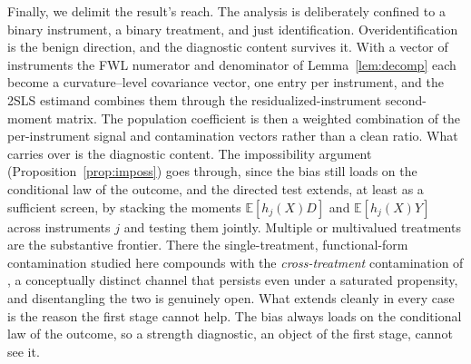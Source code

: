 \documentclass[11pt]{article}
\theoremstyle{plain}
\theoremstyle{definition}
\newcommand{\E}{\mathbb{E}}
\begin{document}
Finally, we delimit the result's reach. The analysis is deliberately confined to a binary instrument, a binary treatment, and just identification. Overidentification is the benign direction, and the diagnostic content survives it. With a vector of instruments the FWL numerator and denominator of Lemma~\ref{lem:decomp} each become a curvature--level covariance vector, one entry per instrument, and the 2SLS estimand combines them through the residualized-instrument second-moment matrix. The population coefficient is then a weighted combination of the per-instrument signal and contamination vectors rather than a clean ratio. What carries over is the diagnostic content. The impossibility argument (Proposition~\ref{prop:imposs}) goes through, since the bias still loads on the conditional law of the outcome, and the directed test extends, at least as a sufficient screen, by stacking the moments $\E[h_j(X)D]$ and $\E[h_j(X)Y]$ across instruments $j$ and testing them jointly. Multiple or multivalued treatments are the substantive frontier. There the single-treatment, functional-form contamination studied here compounds with the \emph{cross-treatment} contamination of \citet{gpi2024}, a conceptually distinct channel that persists even under a saturated propensity, and disentangling the two is genuinely open. What extends cleanly in every case is the reason the first stage cannot help. The bias always loads on the conditional law of the outcome, so a strength diagnostic, an object of the first stage, cannot see it.
\end{document}
